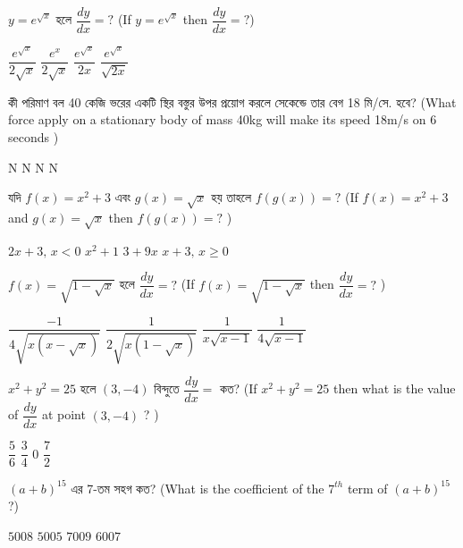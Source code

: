 \documentclass[addpoints]{exam}
\begin{document}
\begin{questions}
\question $ y=e^{\sqrt{x}} $ হলে $ \dfrac{dy}{dx}=?  $ (If $ y=e^{\sqrt{x}} $ then $ \dfrac{dy}{dx}=?  $) 

\begin{oneparchoices}
\choice $ \dfrac{e^{\sqrt{x}}}{2\sqrt{x}} $
\choice $ \dfrac{e^{x}}{2\sqrt{x}} $
\choice $ \dfrac{e^{\sqrt{x}}}{2x} $
\choice $ \dfrac{e^{\sqrt{x}}}{\sqrt{2x}} $
\end{oneparchoices}

\question কী পরিমাণ বল 40 কেজি ভরের একটি স্থির বস্তুর উপর প্রয়োগ করলে সেকেন্ডে তার বেগ 18 মি/সে. হবে? (What force apply on a stationary body of mass 40kg will make its speed 18m/s on 6 seconds )

\begin{oneparchoices}
 N
 N
 N
 N
\end{oneparchoices}

\question যদি $ f(x) = x^{2}+3 $ এবং $ g(x) = \sqrt{x} $ হয় তাহলে $ f(g(x)) = ? $ (If $ f(x) = x^{2}+3 $ and $ g(x) = \sqrt{x} $ then $ f(g(x)) = ? $ )

\begin{oneparchoices}
\choice $ 2x+3,\, x<0 $
\choice $ x^{2}+1 $
\choice $ 3+9x $
\choice $ x+3,\,x\ge 0 $
\end{oneparchoices}

\question $ f(x) = \sqrt{1-\sqrt{x}} $  হলে $ \dfrac{dy}{dx}=?  $ (If $ f(x) = \sqrt{1-\sqrt{x}} $ then $ \dfrac{dy}{dx}=?  $ )

\begin{oneparchoices}
\choice $ \dfrac{-1}{4\sqrt{x(x-\sqrt{x})}} $
\choice $ \dfrac{1}{2\sqrt{x(1-\sqrt{x})}} $
\choice $ \dfrac{1}{x\sqrt{x-1}} $
\choice $ \dfrac{1}{4\sqrt{x-1}} $
\end{oneparchoices}

\question $ x^{2}+y^{2}=25 $ হলে $ (3,-4) $ বিন্দুতে $ \dfrac{dy}{dx} = $ কত? (If $ x^{2}+y^{2}=25 $ then what is the value of $ \dfrac{dy}{dx} $ at point $ (3,-4) $ ? )

\begin{oneparchoices}
\choice $ \dfrac{5}{6} $
\choice $ \dfrac{3}{4} $
\choice $ 0 $
\choice  $ \dfrac{7}{2} $
\end{oneparchoices}

\question  $ (a+b)^{15} $ এর 7-তম সহগ কত? (What is the coefficient of the $ 7^{th} $ term of $ (a+b)^{15} $ ?)

\begin{oneparchoices}
\choice $ 5008 $
\choice $ 5005 $
\choice $ 7009 $
\choice $ 6007 $
\end{oneparchoices}


\end{questions}
\end{document}
